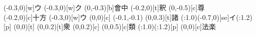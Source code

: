 \documentclass[m_shidai]{subfiles}
\begin{document}
\HUGE
\noindent
{\qyu%
\aki\aki\tsuya{\s}%
\kaigyo[2]\tsuya{\q}\moji(-0.3,0)[w]{ウ}%
\aki\aki\tsuya{\q}\moji(-0.3,0)[w]{ク}}%
\karifu(0,-0.3)[b]{會中}
{\iro{\q}\lwoo%
\iro{\c}\sho{}}%
   {\chikara{\s}\chi\矢[n]%
    \kak\矢[s]\modori\kak\長[n]}%
\newline\hfill
{}
   {\chikara{\s}\tsuya{\q}
   \aki{}\tsuyamochi{\q}\lwoo}
\karifu(-0.2,0)[t]{釈}{\chikara{\lw}}%
\karifu(0,-0.5)[c]{尊}{%
   \uchitsuke{\q}\tsuya{\q}}\\[5truemm]
\karifu(-0.2,0)[c]{十方}{\chikara{\lw}\tsu%
   \aki{\q}\tsuyamochi{\q}\moji(-0.3,0)[w]{ウ}\sho}
\karifu(0,0)[c]{}
{\qyu\moveTo(-0.1,-0.1)\iro{\c}\sho
{}\iro{\c}\sho\tsuya{\q}}
\karifu(0,0.3)[t]{諸}
  {\tsuya{\q}\ooyu{\q}\kili[e]
   \base(\s:1.0)\moji(-0.7,0)[se]{イ}\modori*(\w:1.2)[p]\orisute
   \iro{\k}\sho\iro[2]{\k}\sho}
\karifu(0,0)[t]{}
    {\uchitsuke{\q}\tsuya{\q}\aki\tsuya{\q}}
\newline
\karifu(0,0.2)[t]{衆}{\iro{\c}\chikara{\s}\tsuya{\q}}
\karifu(0,0.2)[c]{}{\tsuya{\q}}
\karifu(0,0.5)[c]{類}{\tsuya{\q}}
{\tsuya{\q}%
\ooyu{\q}\kili[se]\base(\s:1.0)\modori*(\w:1.2)[p]\orisute\iro{\k}\sho\iro[2]{\k}\sho}%
\karifu(0,0)[c]{法楽}
{\uchitsuke{\q}\tsuya{\q}
\aki\tsuya{\q}}
\end{document}
